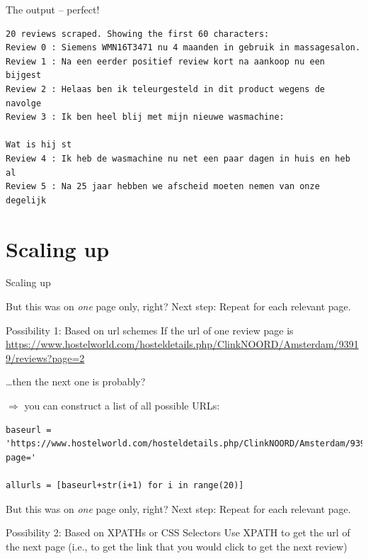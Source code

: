 \documentclass{beamer}
\begin{document}
\begin{frame}[fragile]{The output -- perfect!}
\begin{lstlisting}
20 reviews scraped. Showing the first 60 characters:
Review 0 : Siemens WMN16T3471 nu 4 maanden in gebruik in massagesalon. 
Review 1 : Na een eerder positief review kort na aankoop nu een bijgest
Review 2 : Helaas ben ik teleurgesteld in dit product wegens de navolge
Review 3 : Ik ben heel blij met mijn nieuwe wasmachine: 

Wat is hij st
Review 4 : Ik heb de wasmachine nu net een paar dagen in huis en heb al
Review 5 : Na 25 jaar hebben we afscheid moeten nemen van onze degelijk
\end{lstlisting}
\end{frame}

\section{Scaling up}
\begin{frame}[plain]
	Scaling up
\end{frame}


\begin{frame}[fragile]{But this was on \emph{one} page only, right?}
Next step: Repeat for each relevant page.

\begin{block}{Possibility 1: Based on url schemes}
	If the url of one review page is \url{https://www.hostelworld.com/hosteldetails.php/ClinkNOORD/Amsterdam/93919/reviews?page=2}

\ldots then the next one is probably?
\end{block}

\pause

$\Rightarrow$ you can construct a list of all possible URLs:

\begin{lstlisting}
baseurl = 'https://www.hostelworld.com/hosteldetails.php/ClinkNOORD/Amsterdam/93919/reviews?page='

allurls = [baseurl+str(i+1) for i in range(20)]
\end{lstlisting}	
	
\end{frame}



\begin{frame}[fragile]{But this was on \emph{one} page only, right?}
	Next step: Repeat for each relevant page.
	
	\begin{block}{Possibility 2: Based on XPATHs or CSS Selectors}
	Use XPATH to get the url of the next page (i.e., to get the link that you would click to get the next review)
	\end{block}
	
\end{frame}
\end{document}
